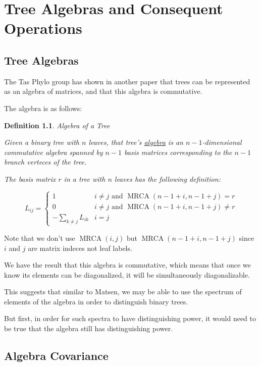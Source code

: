 \documentclass[10pt,a4paper]{report}
\DeclareMathOperator{\MRCA}{MRCA}
\newtheorem{definition}{Definition}
\begin{document}
\chapter{Tree Algebras and Consequent Operations}

\section{Tree Algebras}

The Tas Phylo group has shown in another paper that trees can be represented as
an algebra of matrices, and that this algebra is commutative.

The algebra is as follows:

\begin{definition} Algebra of a Tree

	Given a binary tree with $n$ leaves, that tree's \underline{algebra} is an
	$n-1$-dimensional commutative algebra spanned by $n-1$ basis matrices
	corresponding to the $n-1$ branch verteces of the tree.

	The basis matrix $r$ in a tree with $n$ leaves has the following
	definition:

	\[ L_{ij} = \begin{cases}
		1 & i \neq j \textrm{ and } \MRCA(n-1+i, n-1+j) = r\\
		0 & i \neq j \textrm{ and } \MRCA(n-1+i, n-1+j) \neq r\\
		-\sum_{k \neq j} L_{ik} & i = j
	\end{cases} \]
\end{definition}

Note that we don't use $\MRCA(i, j)$ but $\MRCA(n-1+i, n-1+j)$ since $i$ and $j$ are matrix indeces not leaf labels.

We have the result that this algebra is commutative, which means that once we know its elements can be diagonalized, it will be simultaneously diagonalizable.

This suggests that similar to Matsen, we may be able to use the spectrum of elements of the algebra in order to distinguish binary trees.

But first, in order for such spectra to have distinguishing power, it would need to be true that the algebra still has distinguishing power.

\section{Algebra Covariance}
\end{document}
